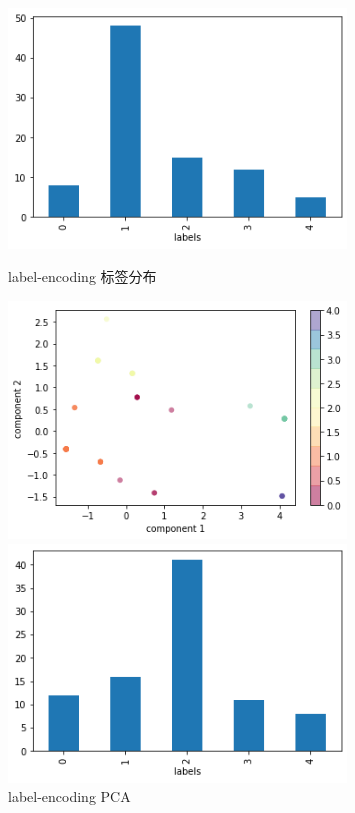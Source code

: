 \begin{figure}[htb]
    \vspace{13pt} %
    \begin{minipage}[htb]{0.5\linewidth}
        \centering
        \includegraphics[width=0.8\textwidth]{images/Kmeans-5-label-distribution-label-encoding.png}
        \caption{label-encoding 标签分布}
    \end{minipage}
    \begin{minipage}[htb]{0.5\linewidth}
        \centering
        \includegraphics[width=0.8\textwidth]{images/Kmeans-5-PCA-label-encoding.png}
        \caption{label-encoding PCA}
    \end{minipage}
    \begin{minipage}[htb]{0.5\linewidth}
        \centering
        \includegraphics[width=0.8\textwidth]{images/Kmeans-5-label-distribution-one-hot.png}

\end{minipage}
\end{figure}
